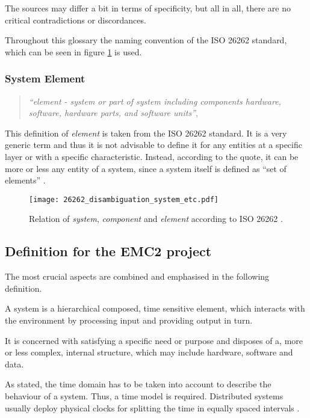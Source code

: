 The sources may differ a bit in terms of specificity, but all in all, there are no critical contradictions or discordances. 

Throughout this glossary the naming convention of the ISO 26262 standard, which can be seen in figure \ref{fig:26262_disambiguation} is used.


\subsubsection{System Element}
\label{sec:system_element}
\begin{quote}
\emph{``element - system or part of system including components hardware, software, hardware parts, and software units''}, \cite{iso26262:1}
\end{quote}
This definition of \emph{element} is taken from the ISO 26262 standard. It is a very generic term and thus it is not advisable to define it for any entities at a specific layer or with a specific characteristic. Instead, according to the quote, it can be more or less any entity of a system, since a system itself is defined as ``set of elements'' \cite{iso26262:1}.

\begin{figure}[ht]
\centering
\texttt{[image: 26262\_disambiguation\_system\_etc.pdf]}

\caption{Relation of \emph{system}, \emph{component} and \emph{element} according to ISO 26262 \cite{iso26262:course1}.}
\label{fig:26262_disambiguation}
\end{figure}

\subsection{Definition for the EMC2 project}
The most crucial aspects are combined and emphasised in the following definition.

\begin{myquote}
A system is a hierarchical composed, time sensitive element, which interacts with the environment by processing input and providing output in turn.

It is concerned with satisfying a specific need or purpose and disposes of a, more or less complex, internal structure, which may include hardware, software and data.
\end{myquote}

As stated, the time domain has to be taken into account to describe the behaviour of a system. Thus, a time model is required. Distributed systems usually deploy physical clocks for splitting the time in equally spaced intervals \cite[p.7-8]{genesys}.

